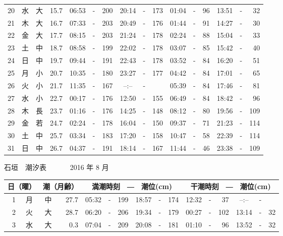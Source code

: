 \documentclass[12pt.a4j]{jsarticle}
\begin{document}
\begin{center}
\begin{table}[ht]
\begin{tabular}{|rc|cr|ccrccr|ccrccr|}
20 & 水 & 大 & 15.7 &  06:53 &-& 200  &  20:14 &-& 173  &   01:04 &-&  96  &   13:51 &-&  32  \\
21 & 木 & 大 & 16.7 &  07:33 &-& 203  &  20:49 &-& 176  &   01:44 &-&  91  &   14:27 &-&  30  \\
22 & 金 & 大 & 17.7 &  08:15 &-& 203  &  21:24 &-& 178  &   02:24 &-&  88  &   15:04 &-&  33  \\
23 & 土 & 中 & 18.7 &  08:58 &-& 199  &  22:02 &-& 178  &   03:07 &-&  85  &   15:42 &-&  40  \\
24 & 日 & 中 & 19.7 &  09:44 &-& 191  &  22:43 &-& 178  &   03:52 &-&  84  &   16:20 &-&  51  \\
25 & 月 & 小 & 20.7 &  10:35 &-& 180  &  23:27 &-& 177  &   04:42 &-&  84  &   17:01 &-&  65  \\
26 & 火 & 小 & 21.7 &  11:35 &-& 167  &  --:-- &-&     &   05:39 &-&  84  &   17:46 &-&  81  \\
27 & 水 & 小 & 22.7 &  00:17 &-& 176  &  12:50 &-& 155  &   06:49 &-&  84  &   18:42 &-&  96  \\
28 & 木 & 長 & 23.7 &  01:16 &-& 176  &  14:25 &-& 148  &   08:12 &-&  80  &   19:56 &-& 109  \\
29 & 金 & 若 & 24.7 &  02:24 &-& 178  &  16:04 &-& 150  &   09:37 &-&  71  &   21:23 &-& 114  \\
30 & 土 & 中 & 25.7 &  03:34 &-& 183  &  17:20 &-& 158  &   10:47 &-&  58  &   22:39 &-& 114  \\
31 & 日 & 中 & 26.7 &  04:37 &-& 191  &  18:14 &-& 167  &   11:44 &-&  46  &   23:38 &-& 109  \\
   \hline
   \end{tabular}
\end{table}
\newpage
 {\LARGE 石垣　潮汐表　　　}
 {\large 2016 年  8 月}\\
 \begin{table}[ht]
    \begin{tabular}{|rc|cr|ccrccr|ccrccr|}
    \hline
    \multicolumn{2}{|c|}{日（曜）} & \multicolumn{2}{c|}{潮（月齢）} & \multicolumn{6}{c|}{満潮時刻　―　潮位(cm)} & \multicolumn{6}{c|}{干潮時刻　―　潮位(cm)} \\
 \hline
 1 & 月 & 中 & 27.7 &  05:32 &-& 199  &  18:57 &-& 174  &   12:32 &-&  37  &   --:-- &-&     \\
 2 & 火 & 大 & 28.7 &  06:20 &-& 206  &  19:34 &-& 179  &   00:27 &-& 102  &   13:14 &-&  32  \\
 3 & 水 & 大 &  0.3 &  07:04 &-& 209  &  20:08 &-& 181  &   01:10 &-&  96  &   13:52 &-&  32  \\

\end{tabular}
\end{table}
\end{center}
\end{document}
